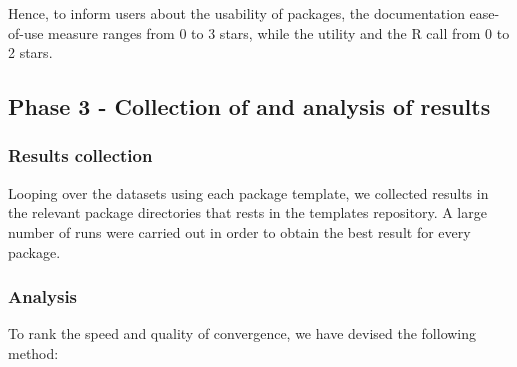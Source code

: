 Hence, to inform users about the usability of packages, the
documentation ease-of-use measure ranges from 0 to 3 stars, while the
utility and the R call from 0 to 2 stars.

\hypertarget{phase-3---collection-of-and-analysis-of-results}{%
\subsection{Phase 3 - Collection of and analysis of
results}\label{phase-3---collection-of-and-analysis-of-results}}

\hypertarget{results-collection}{%
\subsubsection{Results collection}\label{results-collection}}

Looping over the datasets using each package template, we collected
results in the relevant package directories that rests in the templates
repository. A large number of runs were carried out in order to obtain
the best result for every package.

\hypertarget{analysis}{%
\subsubsection{Analysis}\label{analysis}}

To rank the speed and quality of convergence, we have devised the
following method:

